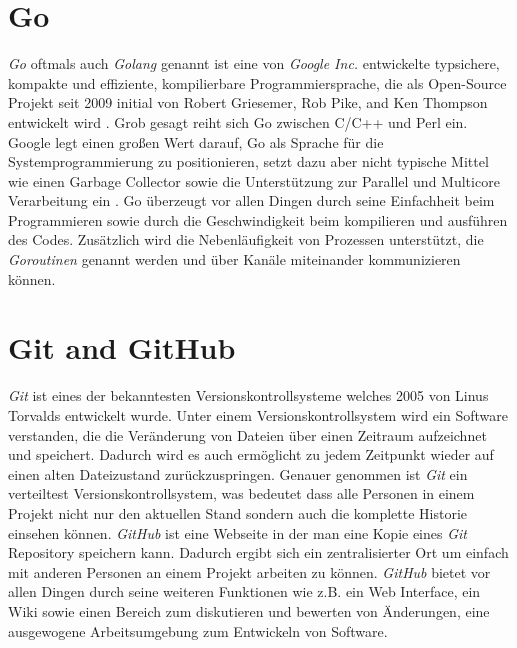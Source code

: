 \section{Go}
\textit{Go} oftmals auch \textit{Golang} genannt ist eine von \textit{Google Inc.} entwickelte typsichere, kompakte und effiziente, kompilierbare Programmiersprache, die als Open-Source Projekt seit 2009 initial von Robert Griesemer, Rob Pike, and Ken Thompson entwickelt wird \autocite{documentation_the_go_programming_language_2019}. Grob gesagt reiht sich Go zwischen C/C++ und Perl ein. Google legt einen großen Wert darauf, Go als Sprache für die Systemprogrammierung zu positionieren, setzt dazu aber nicht typische Mittel wie einen Garbage Collector sowie die Unterstützung zur Parallel und Multicore Verarbeitung ein \autocite{feike_blass_2012}. Go überzeugt vor allen Dingen durch seine Einfachheit beim Programmieren sowie durch die Geschwindigkeit beim kompilieren und ausführen des Codes. Zusätzlich wird die Nebenläufigkeit von Prozessen unterstützt, die \textit{Goroutinen} genannt werden und über Kanäle miteinander kommunizieren können. \autocite{donovan_kernighan_2016}


\section{Git and GitHub}
\textit{Git} ist eines der bekanntesten Versionskontrollsysteme welches 2005 von Linus Torvalds entwickelt wurde. Unter einem Versionskontrollsystem wird ein Software verstanden, die die Veränderung von Dateien über einen Zeitraum aufzeichnet und speichert. Dadurch wird es auch ermöglicht zu jedem Zeitpunkt wieder auf einen alten Dateizustand zurückzuspringen.
Genauer genommen ist \textit{Git} ein verteiltest Versionskontrollsystem, was bedeutet dass alle Personen in einem  Projekt nicht nur den aktuellen Stand sondern auch die komplette Historie einsehen können. \autocite{preissel_stachmann_2017}
\newline
\newline
\textit{GitHub} ist eine Webseite in der man eine Kopie eines \textit{Git} Repository speichern kann. Dadurch ergibt sich ein zentralisierter Ort um einfach mit anderen Personen an einem Projekt  arbeiten zu können. \textit{GitHub} bietet vor allen Dingen durch seine weiteren Funktionen wie z.B. ein Web Interface, ein Wiki sowie einen Bereich zum diskutieren und bewerten von Änderungen, eine ausgewogene Arbeitsumgebung zum Entwickeln von Software. \autocite{bell_2014}